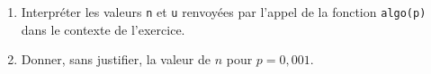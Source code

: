 \begin{enumerate}
	\begin{enumerate}
		\item Interpréter les valeurs \texttt{n} et \texttt{u} renvoyées par l'appel de la fonction \texttt{algo(p)} dans le contexte de l'exercice.
		\item Donner, sans justifier, la valeur de $n$ pour $p=0,001$.
	\end{enumerate}
\end{enumerate}
